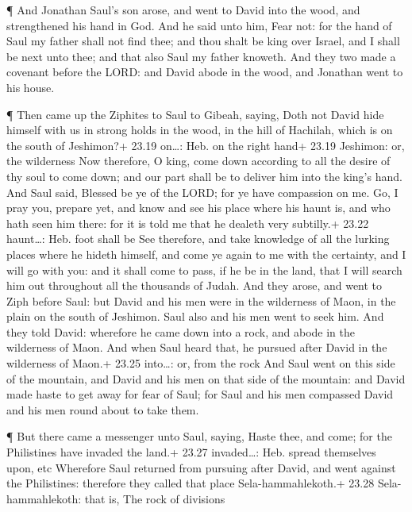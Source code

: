  ¶ And Jonathan Saul's son arose, and went to David into
the wood, and strengthened his hand in God.  And he said
unto him, Fear not: for the hand of Saul my father shall not find thee;
and thou shalt be king over Israel, and I shall be next unto thee; and
that also Saul my father knoweth.  And they two made a
covenant before the LORD: and David abode in the wood, and Jonathan went
to his house.

 ¶ Then came up the Ziphites to Saul to Gibeah, saying,
Doth not David hide himself with us in strong holds in the wood, in the
hill of Hachilah, which is on the south of Jeshimon?+ 23.19 on\ldots:
Heb. on the right hand+ 23.19 Jeshimon: or, the wilderness 
Now therefore, O king, come down according to all the desire of thy soul
to come down; and our part shall be to deliver him into the king's hand.
 And Saul said, Blessed be ye of the LORD; for ye have
compassion on me.  Go, I pray you, prepare yet, and know
and see his place where his haunt is, and who hath seen him there: for
it is told me that he dealeth very subtilly.+ 23.22 haunt\ldots: Heb.
foot shall be  See therefore, and take knowledge of all the
lurking places where he hideth himself, and come ye again to me with the
certainty, and I will go with you: and it shall come to pass, if he be
in the land, that I will search him out throughout all the thousands of
Judah.  And they arose, and went to Ziph before Saul: but
David and his men were in the wilderness of Maon, in the plain on the
south of Jeshimon.  Saul also and his men went to seek him.
And they told David: wherefore he came down into a rock, and abode in
the wilderness of Maon. And when Saul heard that, he pursued after David
in the wilderness of Maon.+ 23.25 into\ldots: or, from the rock
 And Saul went on this side of the mountain, and David and
his men on that side of the mountain: and David made haste to get away
for fear of Saul; for Saul and his men compassed David and his men round
about to take them.

 ¶ But there came a messenger unto Saul, saying, Haste
thee, and come; for the Philistines have invaded the land.+ 23.27
invaded\ldots: Heb. spread themselves upon, etc  Wherefore
Saul returned from pursuing after David, and went against the
Philistines: therefore they called that place Sela-hammahlekoth.+ 23.28
Sela-hammahlekoth: that is, The rock of divisions

